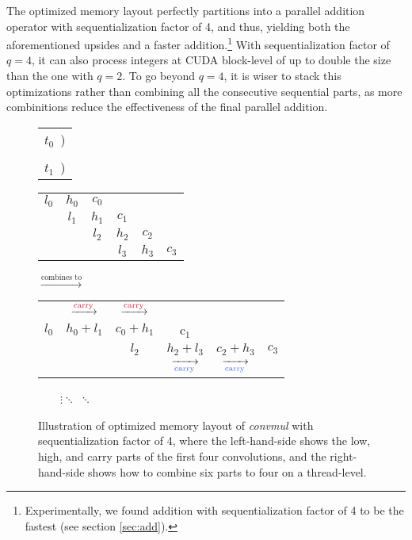The optimized memory layout perfectly partitions into a parallel addition
operator with sequentialization factor of 4, and thus, yielding both the
aforementioned upsides and a faster addition.\footnote{Experimentally, we found
  addition with sequentialization factor of 4 to be the fastest (see section
  \ref{sec:add}).}  With sequentialization factor of $q=4$, it can also process
integers at CUDA block-level of up to double the size than the one with
$q=2$. To go beyond $q=4$, it is wiser to stack this optimizations rather than
combining all the consecutive sequential parts, as more combinitions reduce the
effectiveness of the final parallel addition.



\begin{figure}
  \begin{center}
  \small
  \begin{tabular}{C{0.5cm}}
  \Large{\color{Crimson} $t_0$}~)\\\\
    \Large{\color{RoyalBlue} $t_1$}~)
\end{tabular}
  \begin{tabular}{cccccc}
    \color{Crimson}$l_0$ & \color{Crimson}$h_0$ & \color{Crimson}$c_0$ & & & \\
    & \color{Crimson}$l_1$ & \color{Crimson}$h_1$ & \color{Crimson}$c_1$ & & \\
    & & \color{RoyalBlue}$l_2$ & \color{RoyalBlue}$h_2$ & \color{RoyalBlue}$c_2$ & \\
    & & & \color{RoyalBlue}$l_3$ & \color{RoyalBlue}$h_3$ & \color{RoyalBlue}$c_3$
  \end{tabular}
$\xrightarrow{\text{combines to}}$
\begin{tabular}{cccccc}
     & $\xrightarrow{\scriptsize \text{\color{Crimson}carry}}$ & $\xrightarrow{\scriptsize \text{\color{Crimson}carry}}$ &  &  &  \\
    \color{Crimson}$l_0$ & \color{Crimson}$h_0 + l_1$ & \color{Crimson}$c_0 + h_1$ & \color{Crimson}c$_1$ & & \\
    & & \color{RoyalBlue}$l_2$ & \color{RoyalBlue}$h_2+l_3$ & \color{RoyalBlue}$c_2+h_3$ & \color{RoyalBlue} $c_3$\\
  & & & $\xrightarrow[\scriptsize \text{\color{RoyalBlue}carry}]{}$ & $\xrightarrow[\scriptsize \text{\color{RoyalBlue}carry}]{}$ & \\
\end{tabular}
\end{center}
~~~~$\vdots$\qquad\qquad\qquad\qquad\qquad $\ddots$ \qquad\qquad\qquad\qquad\qquad\qquad\qquad\qquad\qquad\qquad\qquad\qquad  $\ddots$
\caption{\footnotesize Illustration of optimized memory layout of
  \textit{convmul} with sequentialization factor of 4, where the left-hand-side
  shows the low, high, and carry parts of the first four convolutions, and the
  right-hand-side shows how to combine six parts to four on a thread-level.}
  \label{fig:muloptmem}
\end{figure}

